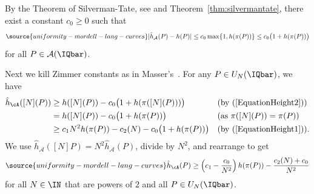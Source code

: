 By the  Theorem of Silverman-Tate, see \cite[Theorem~A]{Silverman} and
Theorem~\ref{thm:silvermantate}, there exist a  constant
$c_0\ge 0$ %
 such that
\begin{equation}
\label{EquationHeight2}
\source{uniformity-mordell-lang-curves}
|\hat{h}_{\mathcal{A}}(P)-h(P)| \le
c_0\max\{1,h(\pi(P))\}\le c_0\bigl(1+h(\pi(P))\bigr)
\end{equation}
for all $P\in \mathcal{A}(\IQbar)$.


Next we kill Zimmer constants as in
Masser's~\cite[Appendix~C]{ZannierBook}.
For any $P\in U_N(\IQbar)$, we have
\begin{align*}
\hat{h}_{\cA}([N](P)) &\ge h([N](P))
-c_0\bigl(1+h(\pi([N](P)))\bigr)
&&\text{(by (\ref{EquationHeight2}))}\\
&= h([N](P))
-c_0\bigl(1+h(\pi(P))\bigr)
&&\text{(as $\pi([N](P))=\pi(P)$)}
\\
&\ge c_1 N^2 h(\pi(P)) -c_2(N) -c_0\bigl(1+h(\pi(P))\bigr)
&&\text{(by (\ref{EquationHeight1})).}
\end{align*}
We use $\hat{h}_{\mathcal{A}}([N]P)=N^2 \hat{h}_{\mathcal{A}}(P)$,
divide by $N^2$, and rearrange to get
\begin{equation*}%
\source{uniformity-mordell-lang-curves}
\hat{h}_{\cA}(P) \ge \left(c_1 - \frac{c_0}{N^2} \right) h(\pi(P)) - \frac{c_2(N)+ c_0}{N^2}
\end{equation*}
for all $N\in\IN$ that are powers of $2$  and all $P \in U_N(\IQbar)$.

